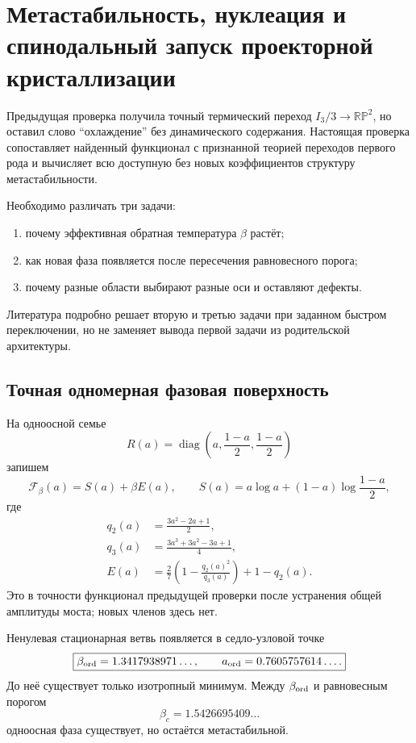 \chapter{Метастабильность, нуклеация и спинодальный запуск проекторной кристаллизации}

Предыдущая проверка получила точный термический переход
$I_3/3\to\mathbb{RP}^2$, но оставил слово ``охлаждение'' без динамического
содержания. Настоящая проверка сопоставляет найденный функционал с признанной
теорией переходов первого рода и вычисляет всю доступную без новых
коэффициентов структуру метастабильности.

Необходимо различать три задачи:
\begin{enumerate}
 \item почему эффективная обратная температура $\beta$ растёт;
 \item как новая фаза появляется после пересечения равновесного порога;
 \item почему разные области выбирают разные оси и оставляют дефекты.
\end{enumerate}
Литература подробно решает вторую и третью задачи при заданном быстром переключении, но
не заменяет вывода первой задачи из родительской архитектуры.

\section{Точная одномерная фазовая поверхность}

На одноосной семье
\begin{equation}
 R(a)=\operatorname{diag}\left(a,\frac{1-a}{2},\frac{1-a}{2}\right)
\end{equation}
запишем
\begin{equation}
 \mathcal F_\beta(a)=S(a)+\beta E(a),
 \qquad
 S(a)=a\log a+(1-a)\log\frac{1-a}{2},
 \label{eq:v6-projective-kinetic-free-energy}
\end{equation}
где
\begin{align}
 q_2(a)&=\frac{3a^2-2a+1}{2},\\
 q_3(a)&=\frac{3a^3+3a^2-3a+1}{4},\\
 E(a)&=\frac27\left(1-\frac{q_2(a)^2}{q_3(a)}\right)
       +1-q_2(a).
 \label{eq:v6-projective-kinetic-energy}
\end{align}
Это в точности функционал предыдущей проверки после устранения общей
амплитуды моста; новых членов здесь нет.

Ненулевая стационарная ветвь появляется в седло-узловой точке
\begin{equation}
 \boxed{\beta_{\rm ord}=1.3417938971\ldots,\qquad
 a_{\rm ord}=0.7605757614\ldots.}
 \label{eq:v6-ordered-spinodal}
\end{equation}
До неё существует только изотропный минимум. Между
$\beta_{\rm ord}$ и равновесным порогом
\begin{equation}
 \beta_c=1.5426695409\ldots
\end{equation}
одноосная фаза существует, но остаётся метастабильной.

